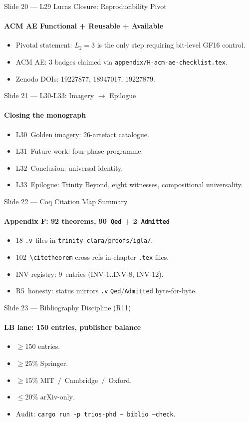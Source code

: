 \documentclass[10pt,aspectratio=169]{beamer}
\begin{document}
\begin{frame}{Slide 20 — L29 Lucas Closure: Reproducibility Pivot}
  \framesubtitle{ACM AE Functional + Reusable + Available}
  \begin{itemize}
    \item Pivotal statement: \(L_2=3\) is the only step requiring
      bit-level GF16 control.
    \item ACM AE: 3 badges claimed via
      \texttt{appendix/H-acm-ae-checklist.tex}.
    \item Zenodo DOIs: 19227877, 18947017, 19227879.
  \end{itemize}
\end{frame}


\begin{frame}{Slide 21 — L30-L33: Imagery \(\to\) Epilogue}
  \framesubtitle{Closing the monograph}
  \begin{itemize}
    \item L30~Golden imagery: 26-artefact catalogue.
    \item L31~Future work: four-phase programme.
    \item L32~Conclusion: universal identity.
    \item L33~Epilogue: Trinity Beyond, eight witnesses, compositional
      universality.
  \end{itemize}
\end{frame}

\begin{frame}{Slide 22 — Coq Citation Map Summary}
  \framesubtitle{Appendix F: 92 theorems, 90~\texttt{Qed} + 2~\texttt{Admitted}}
  \begin{itemize}
    \item 18 \texttt{.v}~files in \texttt{trinity-clara/proofs/igla/}.
    \item 102~\texttt{\textbackslash citetheorem} cross-refs in chapter
      \texttt{.tex} files.
    \item INV registry: 9~entries (INV-1..INV-8, INV-12).
    \item R5~honesty: status mirrors \texttt{.v} \texttt{Qed}/\texttt{Admitted}
      byte-for-byte.
  \end{itemize}
\end{frame}

\begin{frame}{Slide 23 — Bibliography Discipline (R11)}
  \framesubtitle{LB lane: 150 entries, publisher balance}
  \begin{itemize}
    \item \(\ge 150\) entries.
    \item \(\ge 25\%\) Springer.
    \item \(\ge 15\%\) MIT~\(/\)~Cambridge~\(/\)~Oxford.
    \item \(\le 20\%\) arXiv-only.
    \item Audit: \texttt{cargo run -p trios-phd -- biblio --check}.
  \end{itemize}
\end{frame}
\end{document}
